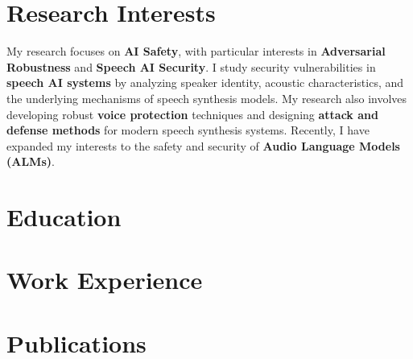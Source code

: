 \documentclass[10pt,a4paper,roman]{moderncv}
\begin{document}
\makecvtitle
\vspace*{-2.8em}

\section{Research Interests}
My research focuses on \textbf{AI Safety}, with particular interests in \textbf{Adversarial Robustness} and \textbf{Speech AI Security}. I study security vulnerabilities in \textbf{speech AI systems} by analyzing speaker identity, acoustic characteristics, and the underlying mechanisms of speech synthesis models. My research also involves developing robust \textbf{voice protection} techniques and designing \textbf{attack and defense methods} for modern speech synthesis systems. Recently, I have expanded my interests to the safety and security of \textbf{Audio Language Models (ALMs)}.

\section{Education}

\section{Work Experience}

\section{Publications}
\end{document}
